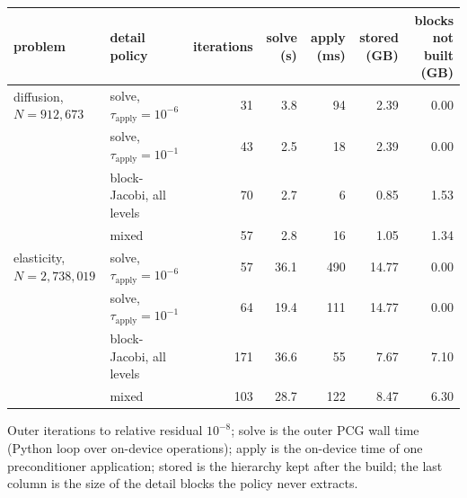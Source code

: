 {\small
\begin{tabular}{llrrrrr}
\toprule
problem & detail policy & iterations & solve (s) & apply (ms) & stored (GB) & blocks not built (GB) \\
\midrule
diffusion, $N = 912{,}673$ & solve, $\tau_{\mathrm{apply}}=10^{-6}$ & 31 & 3.8 & 94 & 2.39 & 0.00 \\
 & solve, $\tau_{\mathrm{apply}}=10^{-1}$ & 43 & 2.5 & 18 & 2.39 & 0.00 \\
 & block-Jacobi, all levels & 70 & 2.7 & 6 & 0.85 & 1.53 \\
 & mixed & 57 & 2.8 & 16 & 1.05 & 1.34 \\
\midrule
elasticity, $N = 2{,}738{,}019$ & solve, $\tau_{\mathrm{apply}}=10^{-6}$ & 57 & 36.1 & 490 & 14.77 & 0.00 \\
 & solve, $\tau_{\mathrm{apply}}=10^{-1}$ & 64 & 19.4 & 111 & 14.77 & 0.00 \\
 & block-Jacobi, all levels & 171 & 36.6 & 55 & 7.67 & 7.10 \\
 & mixed & 103 & 28.7 & 122 & 8.47 & 6.30 \\
\bottomrule
\end{tabular}
\par\smallskip
{\footnotesize Outer iterations to relative residual $10^{-8}$; solve is the outer PCG wall time (Python loop over on-device operations); apply is the on-device time of one preconditioner application; stored is the hierarchy kept after the build; the last column is the size of the detail blocks the policy never extracts.}
}
